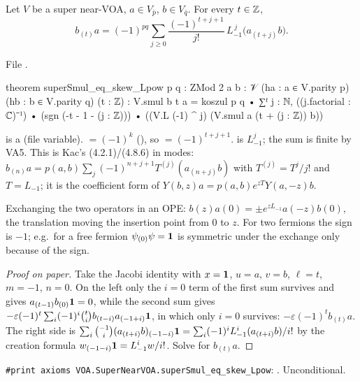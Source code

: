 \begin{theorem}\label{l17:thm:skew}
Let $V$ be a super near-VOA, $a\in V_{\bar p}$, $b\in V_{\bar q}$. For every $t\in{\mathbb{Z}}$,
\begin{equation*}
b_{(t)}a=(-1)^{pq}\sum_{j\ge0}\frac{(-1)^{t+j+1}}{j!}\,L_{-1}^{\,j}\bigl(a_{(t+j)}b\bigr).
\end{equation*}
\end{theorem}
\noindent File .
\begin{leancode}
theorem superSmul_eq_skew_Lpow {p q : ZMod 2} {a b : 𝒱}
    (ha : a ∈ V.parity p) (hb : b ∈ V.parity q) (t : ℤ) :
    V.smul b t a
      = koszul p q • ∑ᶠ j : ℕ, ((j.factorial : ℂ)⁻¹) •
          (sgn (-t - 1 - (j : ℤ))) •
            ((V.L (-1) ^ j) (V.smul a (t + (j : ℤ)) b))
\end{leancode}
\begin{dictionary}
 is a  (file variable).  $=(-1)^k$ (), so  $=(-1)^{t+j+1}$.  is $L_{-1}^j$; the sum is
finite by VA5. This is Kac's (4.2.1)/(4.8.6) in modes: $b_{(n)}a=p(a,b)\sum_j(-1)^{n+j+1}T^{(j)}(a_{(n+j)}b)$
with $T^{(j)}=T^j/j!$ and $T=L_{-1}$; it is the coefficient form of
$Y(b,z)a=p(a,b)e^{zT}Y(a,-z)b$.
\end{dictionary}
\begin{physics}
Exchanging the two operators in an OPE: $b(z)a(0)=\pm e^{zL_{-1}}a(-z)b(0)$, the translation
moving the insertion point from $0$ to $z$. For two fermions the sign is $-1$; e.g.\ for a free
fermion $\psi_{(0)}\psi=\mathbf{1}$ is symmetric under the exchange only because of the sign.
\end{physics}
\begin{proof}[Proof on paper]
Take the Jacobi identity with $x=\mathbf{1}$, $u=a$, $v=b$, $\ell=t$, $m=-1$, $n=0$. On the left
only the $i=0$ term of the first sum survives and gives $a_{(t-1)}b_{(0)}\mathbf{1}=0$, while the
second sum gives $-\varepsilon(-1)^t\sum_i(-1)^i\binom ti b_{(t-i)}a_{(-1+i)}\mathbf{1}$, in which
only $i=0$ survives: $-\varepsilon(-1)^tb_{(t)}a$. The right side is
$\sum_i\binom{-1}{i}(a_{(t+i)}b)_{(-1-i)}\mathbf{1}=\sum_i(-1)^iL_{-1}^i(a_{(t+i)}b)/i!$ by the
creation formula $w_{(-1-i)}\mathbf{1}=L_{-1}^iw/i!$. Solve for $b_{(t)}a$.
\end{proof}
\begin{status}
\texttt{\#print axioms VOA.SuperNearVOA.superSmul\_eq\_skew\_Lpow}: . Unconditional.
\end{status}

